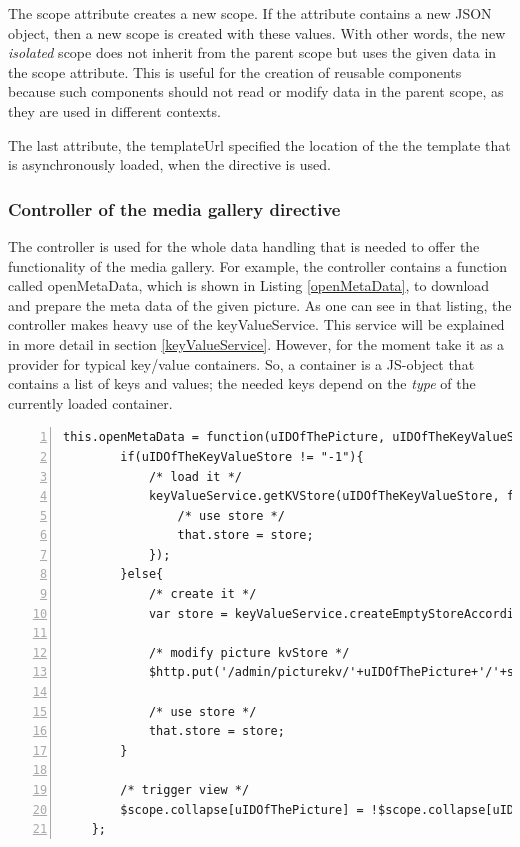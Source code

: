 The scope attribute creates a new scope. If the attribute contains a new \ac{JSON} object, then a new scope is created with these values. With other words, the new \emph{isolated} scope does not inherit from the parent scope but uses the given data in the scope attribute. This is useful for the creation of reusable components because such components should not  read or modify data in the parent scope, as they are used in different contexts. 

The last attribute, the templateUrl specified the location of the the template that is asynchronously loaded, when the directive is used.

\subsubsection{Controller of the media gallery directive}
The controller is used for the whole data handling that is needed to offer the functionality of the media gallery. For example, the controller contains a function called openMetaData, which is shown in Listing \ref{openMetaData}, to download and prepare the meta data of the given picture. As one can see in that listing, the controller makes heavy use of the keyValueService. This service will be explained in more detail in section \ref{keyValueService}. However, for the moment take it as a provider for typical key/value containers. So, a container is a \ac{JS}-object that contains a list of keys and values; the needed keys depend on the \emph{type} of the currently loaded container. 

\begin{lstlisting}[numbers=left,caption={The listing shows the openMetaData function.},label=openMetaData,frame=tlbr,breaklines]
    this.openMetaData = function(uIDOfThePicture, uIDOfTheKeyValueStore){
        if(uIDOfTheKeyValueStore != "-1"){
            /* load it */
            keyValueService.getKVStore(uIDOfTheKeyValueStore, function(store){
                /* use store */
                that.store = store;
            });
        }else{
            /* create it */
            var store = keyValueService.createEmptyStoreAccordingToType('img');

            /* modify picture kvStore */
            $http.put('/admin/picturekv/'+uIDOfThePicture+'/'+store.uID);

            /* use store */
            that.store = store;
        }

        /* trigger view */
        $scope.collapse[uIDOfThePicture] = !$scope.collapse[uIDOfThePicture];
    };
\end{lstlisting}

